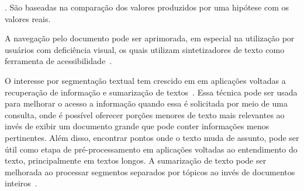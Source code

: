 . São baseadas na comparação dos valores produzidos por uma hipótese com os valores reais. 












A navegação pelo documento pode ser aprimorada, em especial na utilização por usuários com deficiência visual, os quais utilizam  sintetizadores de texto como ferramenta de acessibilidade~\cite{Choi2000}. 








O interesse por segmentação textual tem crescido em em aplicações voltadas a recuperação de informação %
e sumarização de textos~\cite{Maziero2016}. %
Essa técnica pode ser usada para melhorar o acesso a informação quando essa é solicitada por meio de uma consulta, onde é possível oferecer porções menores de texto mais relevantes ao invés de exibir um documento grande que pode conter informações menos pertinentes.  Além disso, encontrar pontos onde o texto muda de assunto, pode ser útil como etapa de pré-processamento em aplicações voltadas ao entendimento do texto, principalmente em textos longos. 
A sumarização de texto pode ser melhorada ao processar segmentos separados por tópicos ao invés de documentos inteiros~\cite{Bhatia2016, Maziero2016, Bokaei2016}. 






